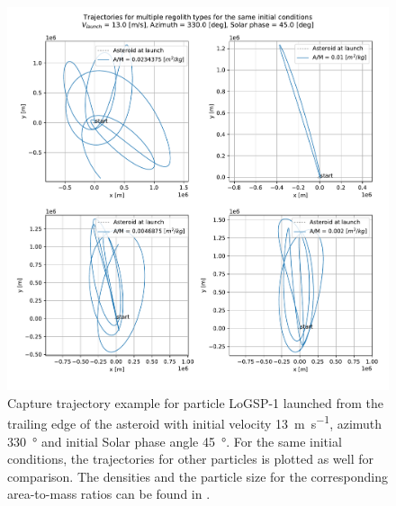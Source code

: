 \begin{figure}[htb]
\centering
\captionsetup{justification=centering}
\includegraphics[width=\textwidth, height=0.6\textheight, keepaspectratio=true]{trailing_edge_perturbations/capture_traj_logsp1_13ms_330azim_45solarPhase_individualTrajPlots.pdf}
\caption{Capture trajectory example for particle LoGSP-1 launched from the trailing edge of the asteroid with initial velocity \SI{13}{\metre\per\second}, azimuth \SI{330}{\degree} and initial Solar phase angle \SI{45}{\degree}. For the same initial conditions, the trajectories for other particles is plotted as well for comparison. The densities and the particle size for the corresponding area-to-mass ratios can be found in .}
\label{fig:trailing_edge_capture_example_logsp1}
\end{figure}
\FloatBarrier


